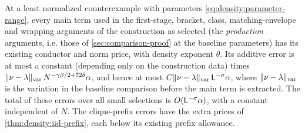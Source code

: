 \begin{proposition}\label{prop:density:production}
At a least normalized counterexample with parameters
\eqref{eq:density:parameter-range}, every main term used in the
first-stage, bracket, class, matching-envelope and wrapping
arguments of the construction as selected (the
\emph{production} arguments, i.e. those of
\cref{sec:comparison-proof} at the baseline parameters) has its
existing conductor and norm price, with density exponent
$\theta$. Its additive error is at most a constant (depending
only on the construction data) times
$\|\nu-\lambda\|_{\rm var}\,
N^{-\gamma\beta/2+72\delta}\alpha$, and hence at most
$C\|\nu-\lambda\|_{\rm var}\,\mathsf L^{-\sigma}\alpha$, where
$\|\nu-\lambda\|_{\rm var}$ is the variation in the baseline
comparison before the main term is extracted.
The total of these errors over all small selections is
$O(\mathsf L^{-\sigma}\alpha)$, with a constant independent of $N$.
The clique-prefix errors have the extra prices of
\cref{thm:density:iid-prefix}, each below its existing prefix allowance.
\end{proposition}

